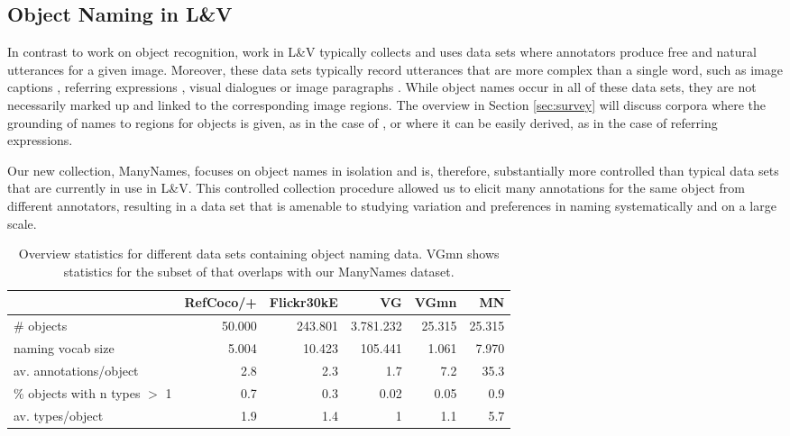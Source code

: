 \subsection{Object Naming in L\&V} 

In contrast to work on object recognition, work in L\&V typically collects and uses data sets where annotators produce free and natural utterances for a given image. 
Moreover, these data sets typically record utterances that are more complex than a single word, such as image captions \cite{fangetal:2015,devlin:imcaqui,Bernardietal:automatic}, referring expressions \cite{Kazemzadeh2014,mao15,Yu2016}, visual dialogues \cite{das2017visual,vries2017guesswhat} or image paragraphs \cite{krause2017hierarchical}. While object names occur in all of these data sets, they are not necessarily marked up and linked to the corresponding image regions. The overview in Section \ref{sec:survey} will discuss corpora where the grounding of names to regions for objects is given, as in the case of \vgenome \cite{krishna2016visualgenome}, or where it can be easily derived, as in the case of referring expressions.

Our new collection, ManyNames, focuses on object names in isolation and is, therefore, substantially more controlled than typical data sets that are currently in use in L\&V. This controlled collection procedure allowed us to elicit many annotations for the same object from different annotators, resulting in a data set that is amenable to studying variation and preferences in naming systematically and on a large scale.

\begin{table*}[htb]
  \centering
  \begin{tabular}{lrrrrr}
    \toprule
    &   RefCoco/+  &  Flickr30kE &           VG &      VGmn &        MN \\
    \midrule
    \# objects & 50.000 & 243.801 & 3.781.232 & 25.315 & 25.315 \\
    naming vocab size &  5.004 &  10.423 &   105.441 &  1.061 &  7.970 \\
    av. annotations/object &      2.8 &       2.3 &         1.7 &      7.2 &     35.3 \\
    \% objects with n types $>$ 1 &      0.7 &       0.3 &         0.02 &      0.05 &      0.9 \\
    av. types/object &      1.9 &       1.4 &         1 &      1.1 &      5.7 \\
    \bottomrule
  \end{tabular}
  \caption{Overview statistics for different data sets containing object naming data. VGmn shows statistics for the subset of \vg that overlaps with our ManyNames dataset.\label{tab:compare}}
\end{table*}


